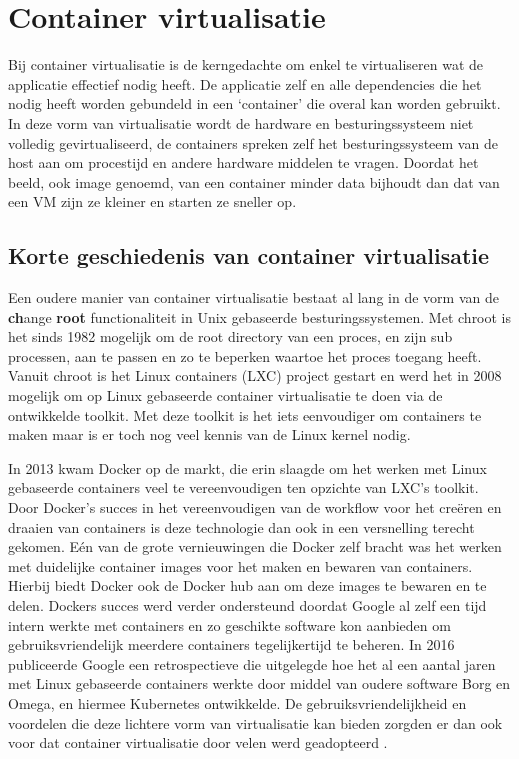 \section{Container virtualisatie}

Bij container virtualisatie is de kerngedachte om enkel te virtualiseren wat de applicatie effectief nodig heeft. De applicatie zelf en alle dependencies die het nodig heeft worden gebundeld in een ‘container’ die overal kan worden gebruikt. In deze vorm van virtualisatie wordt de hardware en besturingssysteem niet volledig gevirtualiseerd, de containers spreken zelf het besturingssysteem van de host aan om procestijd en andere hardware middelen te vragen. Doordat het beeld, ook image genoemd, van een container minder data bijhoudt dan dat van een VM zijn ze kleiner en starten ze sneller op\autocite{Eder2016,Jangla2018}.

\subsection{Korte geschiedenis van container virtualisatie}

Een oudere manier van container virtualisatie bestaat al lang in de vorm van de \textbf{ch}ange \textbf{root} functionaliteit in Unix gebaseerde besturingssystemen. Met chroot is het sinds 1982 mogelijk om de root directory van een proces, en zijn sub processen, aan te passen en zo te beperken waartoe het proces toegang heeft. Vanuit chroot is het Linux containers (LXC) project gestart en werd het in 2008 mogelijk om op Linux gebaseerde container virtualisatie te doen via de ontwikkelde toolkit. Met deze toolkit is het iets eenvoudiger om containers te maken maar is er toch nog veel kennis van de Linux kernel nodig\autocite{Eder2016,SenthilKumaran2017}.

In 2013 kwam Docker op de markt, die erin slaagde om het werken met Linux gebaseerde containers veel te vereenvoudigen ten opzichte van LXC’s toolkit\autocite{Hykes2013}. Door Docker’s succes in het vereenvoudigen van de workflow voor het creëren en draaien van containers is deze technologie dan ook in een versnelling terecht gekomen. Eén van de grote vernieuwingen die Docker zelf bracht was het werken met duidelijke container images voor het maken en bewaren van containers. Hierbij biedt Docker ook de Docker hub aan om deze images te bewaren en te delen. Dockers succes werd verder ondersteund doordat Google al zelf een tijd intern werkte met containers en zo geschikte software kon aanbieden om gebruiksvriendelijk meerdere containers tegelijkertijd te beheren. In 2016 publiceerde Google een retrospectieve die uitgelegde hoe het al een aantal jaren met Linux gebaseerde containers werkte door middel van oudere software Borg en Omega, en hiermee Kubernetes ontwikkelde. De gebruiksvriendelijkheid en voordelen die deze lichtere vorm van virtualisatie kan bieden zorgden er dan ook voor dat container virtualisatie door velen werd geadopteerd \autocite{Eder2016}.

